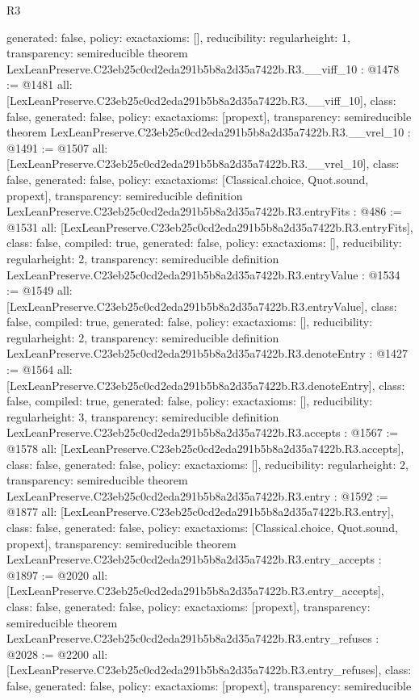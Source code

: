 \begin{lexlean}{R3}
\begin{coremodule}
{  generated: false,
  policy: exact{axioms: []},
  reducibility: regular{height: 1},
  transparency: semireducible
}
theorem LexLeanPreserve.C23eb25c0cd2eda291b5b8a2d35a7422b.R3.__viff_10 : @1478 := @1481 {
  all: [LexLeanPreserve.C23eb25c0cd2eda291b5b8a2d35a7422b.R3.__viff_10],
  class: false,
  generated: false,
  policy: exact{axioms: [propext]},
  transparency: semireducible
}
theorem LexLeanPreserve.C23eb25c0cd2eda291b5b8a2d35a7422b.R3.__vrel_10 : @1491 := @1507 {
  all: [LexLeanPreserve.C23eb25c0cd2eda291b5b8a2d35a7422b.R3.__vrel_10],
  class: false,
  generated: false,
  policy: exact{axioms: [Classical.choice, Quot.sound, propext]},
  transparency: semireducible
}
definition LexLeanPreserve.C23eb25c0cd2eda291b5b8a2d35a7422b.R3.entryFits : @486 := @1531 {
  all: [LexLeanPreserve.C23eb25c0cd2eda291b5b8a2d35a7422b.R3.entryFits],
  class: false,
  compiled: true,
  generated: false,
  policy: exact{axioms: []},
  reducibility: regular{height: 2},
  transparency: semireducible
}
definition LexLeanPreserve.C23eb25c0cd2eda291b5b8a2d35a7422b.R3.entryValue : @1534 := @1549 {
  all: [LexLeanPreserve.C23eb25c0cd2eda291b5b8a2d35a7422b.R3.entryValue],
  class: false,
  compiled: true,
  generated: false,
  policy: exact{axioms: []},
  reducibility: regular{height: 2},
  transparency: semireducible
}
definition LexLeanPreserve.C23eb25c0cd2eda291b5b8a2d35a7422b.R3.denoteEntry : @1427 := @1564 {
  all: [LexLeanPreserve.C23eb25c0cd2eda291b5b8a2d35a7422b.R3.denoteEntry],
  class: false,
  compiled: true,
  generated: false,
  policy: exact{axioms: []},
  reducibility: regular{height: 3},
  transparency: semireducible
}
definition LexLeanPreserve.C23eb25c0cd2eda291b5b8a2d35a7422b.R3.accepts : @1567 := @1578 {
  all: [LexLeanPreserve.C23eb25c0cd2eda291b5b8a2d35a7422b.R3.accepts],
  class: false,
  generated: false,
  policy: exact{axioms: []},
  reducibility: regular{height: 2},
  transparency: semireducible
}
theorem LexLeanPreserve.C23eb25c0cd2eda291b5b8a2d35a7422b.R3.entry : @1592 := @1877 {
  all: [LexLeanPreserve.C23eb25c0cd2eda291b5b8a2d35a7422b.R3.entry],
  class: false,
  generated: false,
  policy: exact{axioms: [Classical.choice, Quot.sound, propext]},
  transparency: semireducible
}
theorem LexLeanPreserve.C23eb25c0cd2eda291b5b8a2d35a7422b.R3.entry_accepts : @1897 := @2020 {
  all: [LexLeanPreserve.C23eb25c0cd2eda291b5b8a2d35a7422b.R3.entry_accepts],
  class: false,
  generated: false,
  policy: exact{axioms: [propext]},
  transparency: semireducible
}
theorem LexLeanPreserve.C23eb25c0cd2eda291b5b8a2d35a7422b.R3.entry_refuses : @2028 := @2200 {
  all: [LexLeanPreserve.C23eb25c0cd2eda291b5b8a2d35a7422b.R3.entry_refuses],
  class: false,
  generated: false,
  policy: exact{axioms: [propext]},
  transparency: semireducible
}


\end{coremodule}
\end{lexlean}
